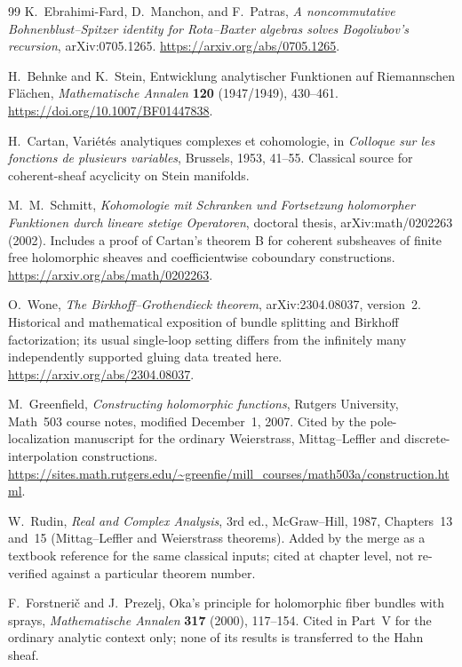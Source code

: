 \documentclass[11pt,letterpaper]{article}
\theoremstyle{definition}
\theoremstyle{remark}
\numberwithin{equation}{section}
\begin{document}
\begin{thebibliography}{99}
K.~Ebrahimi-Fard, D.~Manchon, and F.~Patras, \emph{A noncommutative
Bohnenblust--Spitzer identity for Rota--Baxter algebras solves Bogoliubov's
recursion}, arXiv:0705.1265.
\url{https://arxiv.org/abs/0705.1265}.

H.~Behnke and K.~Stein, Entwicklung analytischer Funktionen auf Riemannschen
Fl\"achen, \emph{Mathematische Annalen} \textbf{120} (1947/1949), 430--461.
\url{https://doi.org/10.1007/BF01447838}.

H.~Cartan, Vari\'et\'es analytiques complexes et cohomologie, in
\emph{Colloque sur les fonctions de plusieurs variables}, Brussels, 1953,
41--55. Classical source for coherent-sheaf acyclicity on Stein manifolds.

M.~M.~Schmitt, \emph{Kohomologie mit Schranken und Fortsetzung holomorpher
Funktionen durch lineare stetige Operatoren}, doctoral thesis,
arXiv:math/0202263 (2002). Includes a proof of Cartan's theorem B for coherent
subsheaves of finite free holomorphic sheaves and coefficientwise coboundary
constructions.
\url{https://arxiv.org/abs/math/0202263}.

O.~Wone, \emph{The Birkhoff--Grothendieck theorem}, arXiv:2304.08037,
version~2. Historical and mathematical exposition of bundle splitting and
Birkhoff factorization; its usual single-loop setting differs from the
infinitely many independently supported gluing data treated here.
\url{https://arxiv.org/abs/2304.08037}.

M.~Greenfield, \emph{Constructing holomorphic functions}, Rutgers University,
Math~503 course notes, modified December~1, 2007. Cited by the
pole-localization manuscript for the ordinary Weierstrass, Mittag--Leffler and
discrete-interpolation constructions.
\url{https://sites.math.rutgers.edu/~greenfie/mill_courses/math503a/construction.html}.

W.~Rudin, \emph{Real and Complex Analysis}, 3rd ed., McGraw--Hill, 1987,
Chapters~13 and~15 (Mittag--Leffler and Weierstrass theorems). Added by the
merge as a textbook reference for the same classical inputs; cited at chapter
level, not re-verified against a particular theorem number.

F.~Forstneri\v{c} and J.~Prezelj, Oka's principle for holomorphic fiber
bundles with sprays, \emph{Mathematische Annalen} \textbf{317} (2000),
117--154. Cited in Part~V for the ordinary analytic context only; none of its
results is transferred to the Hahn sheaf.


\end{thebibliography}
\end{document}
